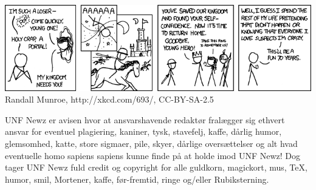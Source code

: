 \begin{minipage}[b]{0.95\linewidth}
\begin{center}
\includegraphics[width=\linewidth]{childrens_fantasy.png}
\tiny Randall Munroe, http://xkcd.com/693/, CC-BY-SA-2.5

\tiny UNF Newz er avisen hvor at ansvarshavende redaktør fralægger sig ethvert ansvar for eventuel plagiering, kaniner, tysk, stavefelj, kaffe, dårlig humor, glemsomhed, katte, store sigmaer, pile, skyer, dårlige oversættelser og alt hvad eventuelle homo sapiens sapiens kunne finde på at holde imod UNF Newz! Dog tager UNF Newz fuld credit og copyright for alle guldkorn, magickort, mus, \TeX, humor, smil, Mortener, kaffe, før-fremtid, ringe og/eller Rubiksterning.
\end{center}
\end{minipage}

